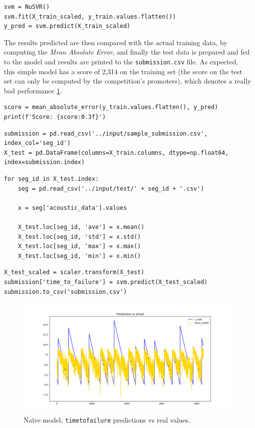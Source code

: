 \begin{lstlisting}[firstnumber=45]
svm = NuSVR()
svm.fit(X_train_scaled, y_train.values.flatten())
y_pred = svm.predict(X_train_scaled)
\end{lstlisting}

The results predicted are then compared with the actual training data, by computing the \textit{Mean Absolute Error}, and finally the test data is prepared and fed to the model and results are printed to the \texttt{submission.csv} file. As expected, this simple model has a score of 2,314 on the training set (the score on the test set can only be computed by the competition's promoters), which denotes a really bad performance \ref{fig:naive}.

\begin{lstlisting}[firstnumber=48]
score = mean_absolute_error(y_train.values.flatten(), y_pred)
print(f'Score: {score:0.3f}')
\end{lstlisting}

\begin{lstlisting}[firstnumber=50]
submission = pd.read_csv('../input/sample_submission.csv', index_col='seg_id')
X_test = pd.DataFrame(columns=X_train.columns, dtype=np.float64, index=submission.index)
\end{lstlisting}

\begin{lstlisting}[firstnumber=52]
for seg_id in X_test.index:
    seg = pd.read_csv('../input/test/' + seg_id + '.csv')
    
    x = seg['acoustic_data'].values
    
    X_test.loc[seg_id, 'ave'] = x.mean()
    X_test.loc[seg_id, 'std'] = x.std()
    X_test.loc[seg_id, 'max'] = x.max()
    X_test.loc[seg_id, 'min'] = x.min()
\end{lstlisting}

\begin{lstlisting}[firstnumber=61]
X_test_scaled = scaler.transform(X_test)
submission['time_to_failure'] = svm.predict(X_test_scaled)
submission.to_csv('submission.csv')
\end{lstlisting}

\begin{figure} [h]
	\centering
	\includegraphics[width=1\linewidth]{pictures/naive.png}
	\caption{Na{\"i}ve model, \texttt{time\textunderscore to\textunderscore failure} predictions vs real values.}
	\label{fig:naive}
\end{figure}